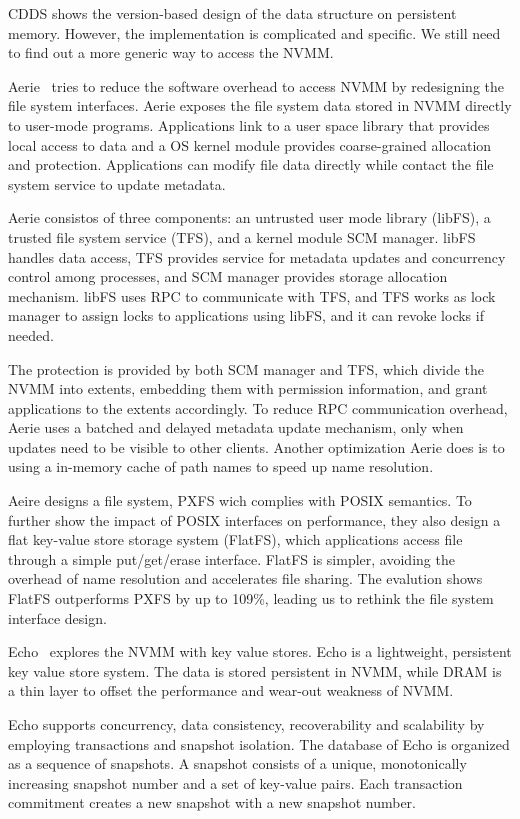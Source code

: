 CDDS shows the version-based design of the data structure on persistent
memory. However, the implementation is complicated and specific. We still
need to find out a more generic way to access the NVMM.

Aerie~\cite{Aerie} tries to reduce the software overhead to access NVMM
by redesigning the file system interfaces. Aerie exposes the file system
data stored in NVMM directly to user-mode programs. Applications link to
a user space library that provides local access to data and a OS kernel
module provides coarse-grained allocation and protection. Applications can
modify file data directly while contact the file system service to update
metadata.

Aerie consistos of three components: an untrusted user mode library (libFS),
a trusted file system service (TFS), and a kernel module SCM manager. libFS
handles data access, TFS provides service for metadata updates and concurrency
control among processes, and SCM manager provides storage allocation mechanism.
libFS uses RPC to communicate with TFS, and TFS works as lock manager to 
assign locks to applications using libFS, and it can revoke locks if needed.

The protection is provided by both SCM manager and TFS, which divide the NVMM
into extents, embedding them with permission information, and grant applications
to the extents accordingly. To reduce RPC communication overhead, Aerie
uses a batched and delayed metadata update mechanism, only when updates need to
be visible to other clients. Another optimization Aerie does is to using
a in-memory cache of path names to speed up name resolution.

Aeire designs a file system, PXFS wich complies with POSIX semantics. To further show the impact of POSIX interfaces on performance, they also design a flat
key-value store storage system (FlatFS), which applications access file
through a simple put/get/erase interface. FlatFS is simpler, avoiding the overhead of name resolution and accelerates file sharing. The evalution shows FlatFS
outperforms PXFS by up to 109\%, leading us to rethink the file system interface design.

Echo~\cite{echo} explores the NVMM with key value stores. Echo is a lightweight,
persistent key value store system. The data is stored persistent in NVMM,
while DRAM is a thin layer to offset the performance and wear-out weakness of
NVMM.

Echo supports concurrency, data consistency, recoverability and scalability
by employing transactions and snapshot isolation. The database of Echo is organized as a sequence of snapshots. A snapshot consists of a unique, monotonically
increasing snapshot number and a set of key-value pairs. Each transaction
commitment creates a new snapshot with a new snapshot number. 

